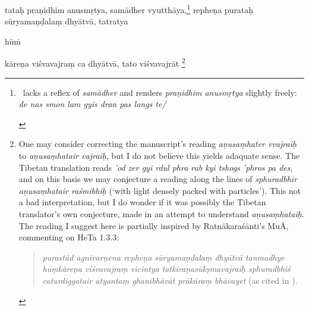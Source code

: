 \documentclass[naipra.tex]{subfiles}
\begin{document}
\begin{sanskrit}
\pstart
tataḥ praṇidhim anusmṛtya, samādher vyutthāya,\footnote{
	\begin{english}%
		\TIB\ lacks a reflex of \emph{samādher} and renders \emph{praṇidhim anusmṛtya} slightly freely: \emph{de nas smon lam gyis dran pas langs te/}
	\end{english}
} repheṇa purataḥ sūryamaṇḍalaṃ dhyātvā, tatratya\dsh \begin{mantra}hūṁ\end{mantra}\dsh kāreṇa viśvavajraṃ ca dhyātvā, tato viśvavajrāt \footnote{
	\begin{english}%
		One may consider correcting the manuscript's reading \emph{aṇusaṃhater vvajraiḥ} to \emph{aṇusaṃhatair vajraiḥ}, but I do not believe this yields adaquate sense.
		The Tibetan translation reads \emph{'od zer gyi rdul phra rab kyi tshogs 'phros pa des}, and on this basis we may conjecture a reading along the lines of \emph{sphuradbhir aṇusaṃhatair raśmibhiḥ} (`with light densely packed with particles'). 
		This not a bad interpretation, but I do wonder if it was possibly the Tibetan translator's own conjecture, made in an attempt to understand \emph{aṇusaṃhataiḥ}.
		The reading I suggest here is partially inspired by Ratnākaraśānti's MuĀ, commenting on HeTa 1.3.3:

		\begin{quote}
			\emph{purastād agnivarṇena repheṇa sūryamaṇḍalaṃ dhyātvā tanmadhye hūṃkāreṇa viśvavajraṃ vicintya tatkiraṇasūkṣmavajraiḥ sphuradbhiś caturdiggatair atyantaṃ ghanībhāvāt prākāraṃ bhāvayet} (as cited in \cite[293]{isaacson2007}).
		\end{quote}
	

\end{english}}
\end{sanskrit}
\end{document}
